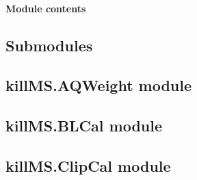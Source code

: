 \documentclass[letterpaper,10pt,english]{sphinxmanual}
\begin{document}
\paragraph{Module contents}
\label{\detokenize{api/killMS.cbuild:module-killMS.cbuild}}\label{\detokenize{api/killMS.cbuild:module-contents}}

\subsection{Submodules}
\label{\detokenize{api/killMS:submodules}}

\subsection{killMS.AQWeight module}
\label{\detokenize{api/killMS:killms-aqweight-module}}

\subsection{killMS.BLCal module}
\label{\detokenize{api/killMS:killms-blcal-module}}

\subsection{killMS.ClipCal module}
\label{\detokenize{api/killMS:module-killMS.ClipCal}}\label{\detokenize{api/killMS:killms-clipcal-module}}
\end{document}
